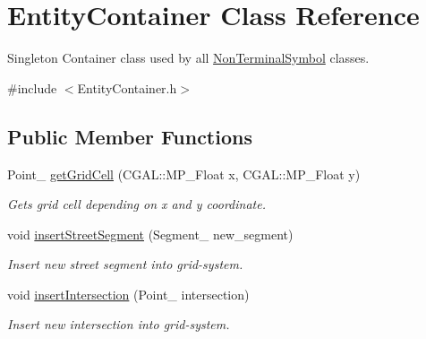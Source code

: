 \hypertarget{class_entity_container}{}\section{Entity\+Container Class Reference}
\label{class_entity_container}


Singleton Container class used by all \hyperlink{class_non_terminal_symbol}{Non\+Terminal\+Symbol} classes.  




{\ttfamily \#include $<$Entity\+Container.\+h$>$}

\subsection*{Public Member Functions}
\begin{DoxyCompactItemize}
\item 
Point\+\_ \hyperlink{class_entity_container_a9a7c554edd1f83a1be2616c0136e42c5}{get\+Grid\+Cell} (C\+G\+A\+L\+::\+M\+P\+\_\+\+Float x, C\+G\+A\+L\+::\+M\+P\+\_\+\+Float y)
\begin{DoxyCompactList}\small\item\em Gets grid cell depending on x and y coordinate. \end{DoxyCompactList}\item 
\hypertarget{class_entity_container_aef2b963be52ce8e8dde81cba5e794834}{}\label{class_entity_container_aef2b963be52ce8e8dde81cba5e794834} 
void \hyperlink{class_entity_container_aef2b963be52ce8e8dde81cba5e794834}{insert\+Street\+Segment} (Segment\+\_ new\+\_\+segment)
\begin{DoxyCompactList}\small\item\em Insert new street segment into grid-\/system. \end{DoxyCompactList}\item 
\hypertarget{class_entity_container_a06738ee0c18eca47bf79a90ee56b8be6}{}\label{class_entity_container_a06738ee0c18eca47bf79a90ee56b8be6} 
void \hyperlink{class_entity_container_a06738ee0c18eca47bf79a90ee56b8be6}{insert\+Intersection} (Point\+\_ intersection)
\begin{DoxyCompactList}\small\item\em Insert new intersection into grid-\/system. \end{DoxyCompactList}\item 
\hypertarget{class_entity_container_a34870620ebef8b20c7685e03e5fde022}{}\label{class_entity_container_a34870620ebef8b20c7685e03e5fde022} 

\end{DoxyCompactItemize}
